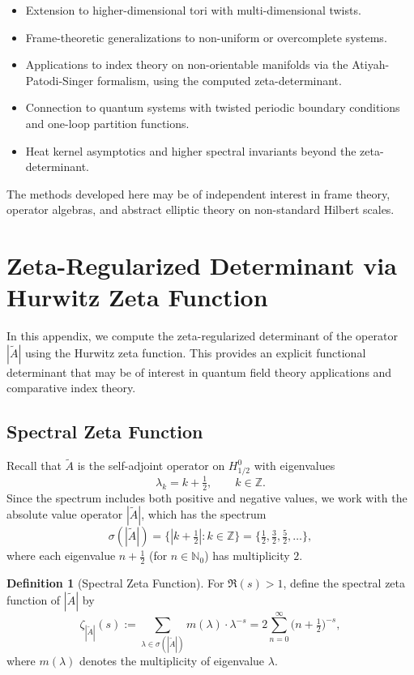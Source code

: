 \documentclass[11pt]{amsart}
\theoremstyle{definition}
\newtheorem{definition}[theorem]{Definition}
\theoremstyle{remark}
\begin{document}
\begin{itemize}
\item Extension to higher-dimensional tori with multi-dimensional twists.
\item Frame-theoretic generalizations to non-uniform or overcomplete systems.
\item Applications to index theory on non-orientable manifolds via the Atiyah-Patodi-Singer formalism, using the computed zeta-determinant.
\item Connection to quantum systems with twisted periodic boundary conditions and one-loop partition functions.
\item Heat kernel asymptotics and higher spectral invariants beyond the zeta-determinant.
\end{itemize}

The methods developed here may be of independent interest in frame theory, operator algebras, and abstract elliptic theory on non-standard Hilbert scales.

\appendix

\section{Zeta-Regularized Determinant via Hurwitz Zeta Function}
\label{app:zeta-det}

In this appendix, we compute the zeta-regularized determinant of the operator $|\widetilde{A}|$ using the Hurwitz zeta function. This provides an explicit functional determinant that may be of interest in quantum field theory applications \cite{elizalde} and comparative index theory.

\subsection{Spectral Zeta Function}

Recall that $\widetilde{A}$ is the self-adjoint operator on $H^0_{1/2}$ with eigenvalues
\[
\lambda_k = k + \tfrac{1}{2}, \qquad k \in \mathbb{Z}.
\]
Since the spectrum includes both positive and negative values, we work with the absolute value operator $|\widetilde{A}|$, which has the spectrum
\[
\sigma(|\widetilde{A}|) = \bigl\{|k + \tfrac{1}{2}| : k \in \mathbb{Z}\bigr\} = \bigl\{\tfrac{1}{2}, \tfrac{3}{2}, \tfrac{5}{2}, \ldots\bigr\},
\]
where each eigenvalue $n + \tfrac{1}{2}$ (for $n \in \mathbb{N}_0$) has multiplicity $2$.

\begin{definition}[Spectral Zeta Function]
For $\Re(s) > 1$, define the spectral zeta function of $|\widetilde{A}|$ by
\[
\zeta_{|\widetilde{A}|}(s) := \sum_{\lambda \in \sigma(|\widetilde{A}|)} m(\lambda) \cdot \lambda^{-s} = 2 \sum_{n=0}^{\infty} \bigl(n + \tfrac{1}{2}\bigr)^{-s},
\]
where $m(\lambda)$ denotes the multiplicity of eigenvalue $\lambda$.
\end{definition}
\end{document}
